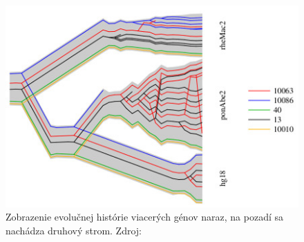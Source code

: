\begin{figure}
\centerline{\includegraphics[width=1\textwidth]{images/DUP-tube-tree}}
\caption{Zobrazenie evolučnej histórie viacerých génov naraz, na pozadí sa nachádza druhový strom. Zdroj:\cite{Vinar2010}}\label{obr:tree}
\end{figure}
